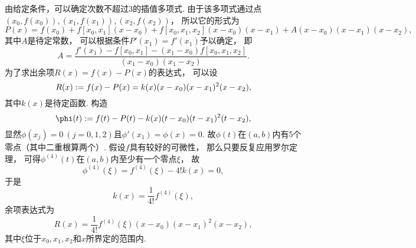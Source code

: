 由给定条件，可以确定次数不超过3的插值多项式.
由于该多项式通过点\(
	(x_0,f(x_0)),
	(x_1,f(x_1)),
	(x_2,f(x_2))
\)，
所以它的形式为\begin{equation*}
	P(x)
	= f(x_0)
	+ f[x_0,x_1] (x-x_0)
	+ f[x_0,x_1,x_2] (x-x_0)(x-x_1)
	+ A (x-x_0)(x-x_1)(x-x_2),
\end{equation*}
其中\(A\)是待定常数，
可以根据条件\(P'(x_1) = f'(x_1)\)予以确定，
即\begin{equation*}
	A = \frac{
		f'(x_1) - f[x_0,x_1] - (x_1-x_0) f[x_0,x_1,x_2]
	}{
		(x_1-x_0)(x_1-x_2)
	}.
\end{equation*}
为了求出余项\(R(x) = f(x) - P(x)\)的表达式，
可以设\begin{equation*}
	R(x)
	:= f(x) - P(x)
	= k(x) (x-x_0) (x-x_1)^2 (x-x_2),
\end{equation*}
其中\(k(x)\)是待定函数.
构造\begin{equation*}
	\phi(t)
	\defeq
	f(t) - P(t) - k(x) (t-x_0) (t-x_1)^2 (t-x_2),
\end{equation*}
显然\(\phi(x_j) = 0\ (j=0,1,2)\)且\(\phi'(x_1) = \phi(x) = 0\).
故\(\phi(t)\)在\((a,b)\)内有5个零点（其中二重根算两个）.
假设\(f\)具有较好的可微性，
那么只要反复应用罗尔定理，
可得\(\phi^{(4)}(t)\)在\((a,b)\)内至少有一个零点\(\xi\)，
故\begin{equation*}
	\phi^{(4)}(\xi) = f^{(4)}(\xi) - 4! k(x) = 0,
\end{equation*}
于是\begin{equation*}
	k(x) = \frac1{4!} f^{(4)}(\xi),
\end{equation*}
余项表达式为\begin{equation*}
	R(x) = \frac1{4!} f^{(4)}(\xi) (x-x_0) (x-x_1)^2 (x-x_2),
\end{equation*}
其中\(\xi\)位于\(x_0,x_1,x_2\)和\(x\)所界定的范围内.

